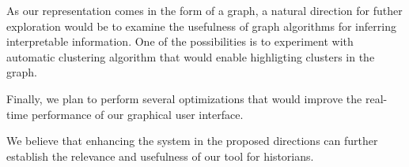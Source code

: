 As our representation comes in the form of a graph, a natural direction for futher exploration would be to examine the usefulness of 
graph algorithms for inferring interpretable information. One of the possibilities is to experiment with automatic clustering algorithm 
that would enable highligting clusters in the graph. 

Finally, we plan to perform several optimizations that would improve the real-time performance of our graphical user interface.  

We believe that enhancing the system in the proposed directions can further establish the relevance and usefulness of our tool for historians.  

